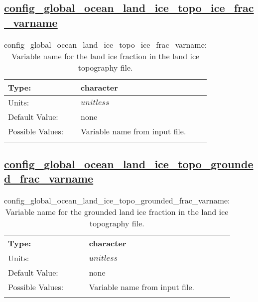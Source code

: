\subsection[config\_global\_ocean\_land\_ice\_topo\_ice\_frac\_varname]{\hyperref[sec:nm_tab_global_ocean]{config\_global\_ocean\_land\_ice\_topo\_ice\_frac\_varname}}
\label{subsec:nm_sec_config_global_ocean_land_ice_topo_ice_frac_varname}
\begin{center}
\begin{longtable}{| p{2.0in} || p{4.0in} |}
    \hline
    Type: & character \\
    \hline
    Units: & $unitless$ \\
    \hline
    Default Value: & none \\
    \hline
    Possible Values: & Variable name from input file. \\
    \hline
    \caption{config\_global\_ocean\_land\_ice\_topo\_ice\_frac\_varname: Variable name for the land ice fraction in the land ice topography file.}
\end{longtable}
\end{center}
\subsection[config\_global\_ocean\_land\_ice\_topo\_grounded\_frac\_varname]{\hyperref[sec:nm_tab_global_ocean]{config\_global\_ocean\_land\_ice\_topo\_grounded\_frac\_varname}}
\label{subsec:nm_sec_config_global_ocean_land_ice_topo_grounded_frac_varname}
\begin{center}
\begin{longtable}{| p{2.0in} || p{4.0in} |}
    \hline
    Type: & character \\
    \hline
    Units: & $unitless$ \\
    \hline
    Default Value: & none \\
    \hline
    Possible Values: & Variable name from input file. \\
    \hline
    \caption{config\_global\_ocean\_land\_ice\_topo\_grounded\_frac\_varname: Variable name for the grounded land ice fraction in the land ice topography file.}
\end{longtable}
\end{center}
